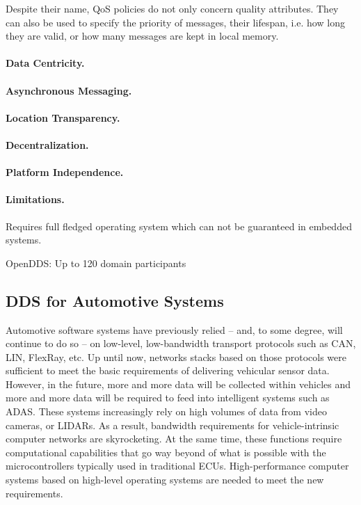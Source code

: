 Despite their name, QoS policies do not only concern quality attributes. They can also be used to specify the priority of messages, their lifespan, i.e. how long they are valid, or how many messages are kept in local memory.



\paragraph{Data Centricity.}

\paragraph{Asynchronous Messaging.}


\paragraph{Location Transparency.}

\paragraph{Decentralization.}

\paragraph{Platform Independence.}


\paragraph{Limitations.}
Requires full fledged operating system which can not be guaranteed in embedded systems.

OpenDDS: Up to 120 domain participants


\subsection{DDS for Automotive Systems}
Automotive software systems have previously relied -- and, to some degree, will continue to do so -- on low-level, low-bandwidth transport protocols such as CAN, LIN, FlexRay, etc. Up until now, networks stacks based on those protocols were sufficient to meet the basic requirements of delivering vehicular sensor data. However, in the future, more and more data will be collected within vehicles and more and more data will be required to feed into intelligent systems such as ADAS. These systems increasingly rely on high volumes of data from video cameras, or LIDARs. As a result, bandwidth requirements for vehicle-intrinsic computer networks are skyrocketing. At the same time, these functions require computational capabilities that go way beyond of what is possible with the microcontrollers typically used in traditional ECUs. High-performance computer systems based on high-level operating systems are needed to meet the new requirements.


